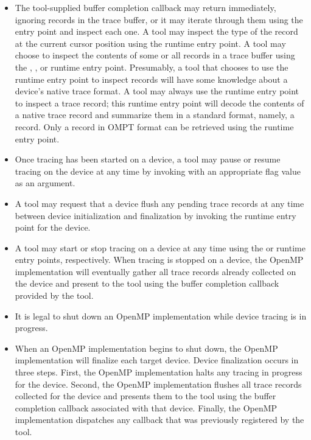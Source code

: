 \begin{itemize}
\item The tool-supplied buffer completion callback may return
  immediately, ignoring records in the trace buffer, or it may iterate
  through them using the  entry
  point
  and inspect each one. A tool may inspect the type of the record at
  the current cursor position using the 
  runtime entry point.  A tool may choose to inspect the contents of some or
  all records in a trace buffer using the ,
  , or
   runtime entry point.  Presumably, a tool that
  chooses to use the  runtime entry point to
  inspect records will have some knowledge about a device's native
  trace format.  A tool may always use the
   runtime entry point to inspect a trace
  record; this runtime entry point will decode the contents of a native trace record
  and summarize them in a standard format, namely, a
   record.
  Only a record in OMPT format can be retrieved using the
   runtime entry point.
\item Once tracing has been started on a device, a tool may pause or resume
  tracing on the device at any time by invoking
   with an appropriate flag value as an
  argument.
\item A tool may request that a device flush any pending trace records
  at any time between device initialization and finalization
  by invoking the  runtime entry point for the device.
\item A tool may start or stop tracing on a device at any time using the
   or  runtime entry points,
  respectively. When tracing is stopped on a device, the OpenMP implementation will eventually
  gather all trace records already collected on the device and present to the tool using
  the buffer completion callback provided by the tool.
\item It is legal to shut down an OpenMP implementation while device tracing
is in progress.
\item When an OpenMP implementation begins to shut down, the OpenMP implementation will
  finalize each target device.  Device finalization occurs in three steps.
  First, the OpenMP implementation halts any tracing in progress for the device. Second,
  the OpenMP implementation flushes all trace records collected for the device and presents them to
  the tool using the buffer completion callback associated with that device.
  Finally, the OpenMP implementation dispatches
  any  callback that was previously
  registered by the tool.

\end{itemize}


